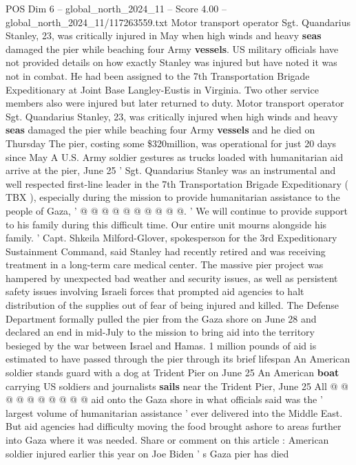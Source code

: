 \begin{textsample}{POS Dim 6 – global\_north\_2024\_11 – Score 4.00 – global\_north\_2024\_11/117263559.txt}  \label{ex:f6_pos_352}
Motor transport operator Sgt.
Quandarius Stanley, 23, was critically injured in May when high winds and heavy \textbf{seas} damaged the pier while beaching four Army \textbf{vessels}.
US military officials have not provided details on how exactly Stanley was injured but have noted it was not in combat.
He had been assigned to the 7th Transportation Brigade Expeditionary at Joint Base Langley-Eustis in Virginia.
Two other service members also were injured but later returned to duty.
Motor transport operator Sgt.
Quandarius Stanley, 23, was critically injured when high winds and heavy \textbf{seas} damaged the pier while beaching four Army \textbf{vessels} and he died on Thursday The pier, costing some \$320million, was operational for just 20 days since May A U.S.
Army soldier gestures as trucks loaded with humanitarian aid arrive at the pier, June 25 ' Sgt.
Quandarius Stanley was an instrumental and well respected first-line leader in the 7th Transportation Brigade Expeditionary ( TBX ), especially during the mission to provide humanitarian assistance to the people of Gaza, ' @ @ @ @ @ @ @ @ @ @. ' We will continue to provide support to his family during this difficult time.
Our entire unit mourns alongside his family. ' Capt.
Shkeila Milford-Glover, spokesperson for the 3rd Expeditionary Sustainment Command, said Stanley had recently retired and was receiving treatment in a long-term care medical center.
The massive pier project was hampered by unexpected bad weather and security issues, as well as persistent safety issues involving Israeli forces that prompted aid agencies to halt distribution of the supplies out of fear of being injured and killed.
The Defense Department formally pulled the pier from the Gaza shore on June 28 and declared an end in mid-July to the mission to bring aid into the territory besieged by the war between Israel and Hamas. 1 million pounds of aid is estimated to have passed through the pier through its brief lifespan An American soldier stands guard with a dog at Trident Pier on June 25 An American \textbf{boat} carrying US soldiers and journalists \textbf{sails} near the Trident Pier, June 25 All @ @ @ @ @ @ @ @ @ @ aid onto the Gaza shore in what officials said was the ' largest volume of humanitarian assistance ' ever delivered into the Middle East.
But aid agencies had difficulty moving the food brought ashore to areas further into Gaza where it was needed.
Share or comment on this article : American soldier injured earlier this year on Joe Biden ' s Gaza pier has died

\end{textsample}
